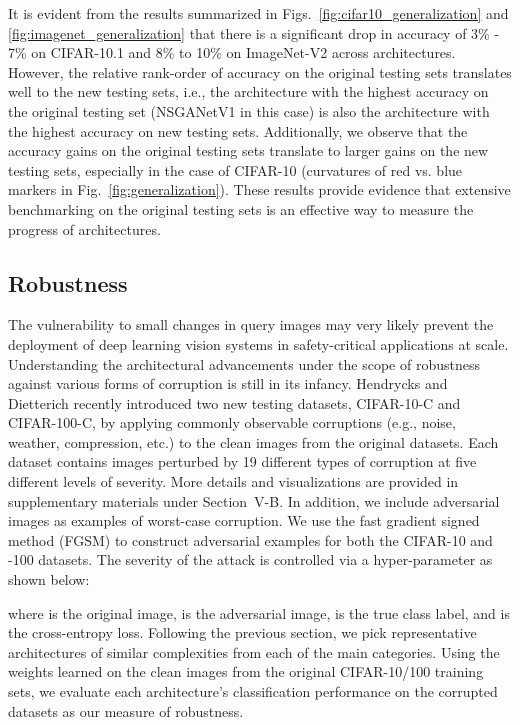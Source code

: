 \documentclass[journal]{IEEEtran}
\def\ourmethod{NSGANetV1}
\theoremstyle{definition}
\theoremstyle{remark}
\begin{document}
It is evident from the results summarized in Figs.~\ref{fig:cifar10_generalization} and \ref{fig:imagenet_generalization} that there is a significant drop in accuracy of 3\% - 7\% on CIFAR-10.1 and 8\% to 10\% on ImageNet-V2 across architectures. However, the relative rank-order of accuracy on the original testing sets translates well to the new testing sets, i.e., the architecture with the highest accuracy on the original testing set (\ourmethod{} in this case) is also the architecture with the highest accuracy on new testing sets. Additionally, we observe that the accuracy gains on the original testing sets translate to larger gains on the new testing sets, especially in the case of CIFAR-10 (curvatures of red vs. blue markers in Fig.~\ref{fig:generalization}). These results provide evidence that extensive benchmarking on the original testing sets is an effective way to measure the progress of architectures.

\vspace{-2mm}
\subsection{Robustness}
The vulnerability to small changes in query images may very likely prevent the deployment of deep learning vision systems in safety-critical applications at scale. Understanding the architectural advancements under the scope of robustness against various forms of corruption is still in its infancy. Hendrycks and Dietterich \cite{hendrycks2018benchmarking} recently introduced two new testing datasets, CIFAR-10-C and CIFAR-100-C, by applying commonly observable corruptions (e.g., noise, weather, compression, etc.) to the clean images from the original datasets. Each dataset contains images perturbed by 19 different types of corruption at five different levels of severity. More details and visualizations are provided in supplementary materials {under} Section~V-B. In addition, we include adversarial images as examples of worst-case corruption. We use the fast gradient signed method (FGSM) \cite{goodfellow2014explaining} to construct adversarial examples for both the CIFAR-10 and -100 datasets. The severity of the attack is controlled via a hyper-parameter  as shown below:

\noindent where  is the original image,  is the adversarial image,  is the true class label, and  is the cross-entropy loss. Following the previous section, we pick representative architectures of similar complexities from each of the main categories. {Using the weights learned on the clean images from the original CIFAR-10/100 training sets, we evaluate each architecture's classification performance on the corrupted datasets as our measure of robustness}.
\end{document}
